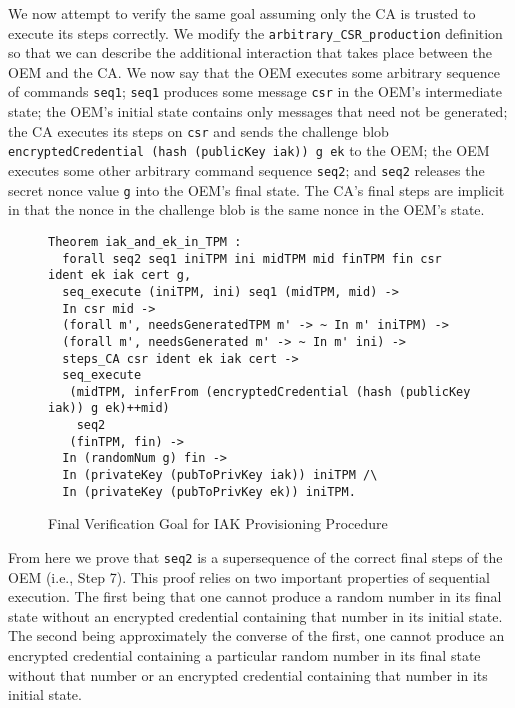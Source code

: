 \documentclass[runningheads]{llncs}
\begin{document}
We now attempt to verify the same goal assuming only the CA is trusted
to execute its steps correctly. 
We modify the \verb|arbitrary_CSR_production| definition 
so that we can describe the additional interaction
that takes place between the OEM and the CA. We now say that
the OEM executes some arbitrary sequence of commands \verb|seq1|;
\verb|seq1| produces some message \verb|csr| in the OEM's intermediate
state; the OEM's initial state contains only messages that need not be
generated; the CA executes its steps on \verb|csr| and sends the
challenge blob \verb|encryptedCredential (hash (publicKey iak)) g ek|
to the OEM; the OEM executes some other arbitrary command sequence \verb|seq2|;
and \verb|seq2| releases the secret nonce value \verb|g| into the OEM's
final state. The CA's final steps are implicit in that the nonce in
the challenge blob is the same nonce in the OEM's state.

\begin{figure}[hptb]
\begin{lstlisting}[language=Coq]
Theorem iak_and_ek_in_TPM :
  forall seq2 seq1 iniTPM ini midTPM mid finTPM fin csr ident ek iak cert g,
  seq_execute (iniTPM, ini) seq1 (midTPM, mid) -> 
  In csr mid ->
  (forall m', needsGeneratedTPM m' -> ~ In m' iniTPM) ->
  (forall m', needsGenerated m' -> ~ In m' ini) ->
  steps_CA csr ident ek iak cert ->
  seq_execute
   (midTPM, inferFrom (encryptedCredential (hash (publicKey iak)) g ek)++mid)
    seq2 
   (finTPM, fin) ->
  In (randomNum g) fin ->
  In (privateKey (pubToPrivKey iak)) iniTPM /\ 
  In (privateKey (pubToPrivKey ek)) iniTPM.
\end{lstlisting}
\caption{Final Verification Goal for IAK Provisioning Procedure}
\label{fig:iak_goal}
\end{figure}

From here we prove that \verb|seq2| is a supersequence of the correct
final steps of the OEM (i.e., Step 7). This proof relies on two
important properties of sequential execution. The first being that one
cannot produce a random number in its final state without an encrypted
credential containing that number in its initial state. The second
being approximately the converse of the first, one cannot produce an
encrypted credential containing a particular random number in its
final state without that number or an encrypted credential containing
that number in its initial state.
\end{document}
